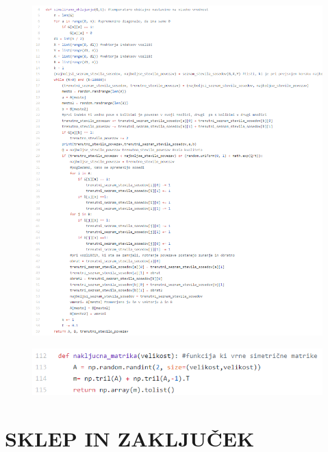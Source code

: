 \documentclass[12pt,a4paper]{amsart}
\theoremstyle{definition} %
\theoremstyle{plain} %
\begin{document}
\FloatBarrier
\begin{figure}
  \centering
  \includegraphics{simulirano}
\end{figure}
\FloatBarrier

\FloatBarrier
\begin{figure}
  \centering
  \includegraphics{matrike}
\end{figure}
\FloatBarrier

\newpage

\section{\textbf{SKLEP IN ZAKLJUČEK}}

\newpage
\end{document}
